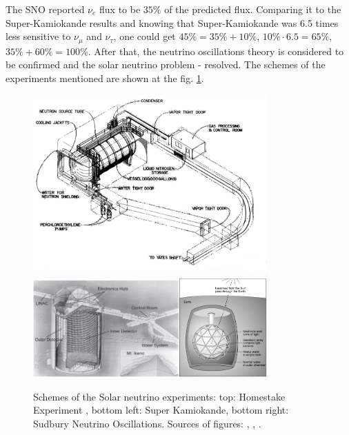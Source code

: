 The SNO reported $\nu_e$ flux to be $35\%$ of the predicted flux. Comparing it to the Super-Kamiokande results and knowing that Super-Kamiokande was 6.5 times less sensitive to $\nu_\mu$ and $\nu_\tau$, one could get $45\%=35\%+10\%$, $10\% \cdot 6.5 = 65\%$, $35\%+60\%=100\%$. After that, the neutrino oscillations theory is considered to be confirmed and the solar neutrino problem - resolved. 
The schemes of the experiments mentioned are shown at the fig. \ref{fig:history_Schemes}.

\begin{figure}
\caption{Schemes of the Solar neutrino experiments: top: Homestake Experiment , bottom left: Super Kamiokande, bottom right: Sudbury Neutrino Oscillations. Sources of figures: \cite{ref_Homestake}, \cite{ref_SuperK}, \cite{ref_fig_SNOscheme}.}
\label{fig:history_Schemes}
\centering
\includegraphics[width=0.80\textwidth, keepaspectratio=true]{figs/history_Homestake01.png}
\includegraphics[width=0.50\textwidth, keepaspectratio=true]{figs/history_SuperK01.png}\includegraphics[width=0.30\textwidth, keepaspectratio=true]{figs/history_SNO01.png}
\end{figure}

